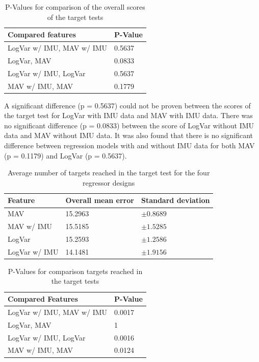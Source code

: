 \documentclass[a4paper, 10pt, conference]{ieeeconf}      %
\begin{document}
\begin{multicol}{2}
	\begin{table}[H]
		\begin{center}
			\begin{tabular}{l l}
				\hline
				\textbf{Compared features} & \textbf{P-Value}\\
				\hline
				LogVar w/ IMU, MAV w/ IMU & 0.5637 \\
				LogVar, MAV & 0.0833 \\
				LogVar w/ IMU, LogVar & 0.5637 \\
				MAV w/ IMU, MAV & 0.1779 \\
				\hline
			\end{tabular}
			\caption{P-Values for comparison of the overall scores of the target tests}
		\end{center}
	\end{table}
	
	A significant difference (p = 0.5637) could not be proven between the scores of the target test for LogVar with IMU data and MAV with IMU data. There was no significant difference (p = 0.0833) between the score of LogVar without IMU data and MAV without IMU data. It was also found that there is no significant difference between regression models with and without IMU data for both MAV (p = 0.1179) and LogVar (p = 0.5637).	
	
	\begin{table}[H]
		\begin{center}
			\begin{tabular}{l l l}
				\hline
				\textbf{Feature} & \textbf{Overall mean error} & \textbf{Standard deviation}\\
				\hline
				MAV & 15.2963 & $\pm 0.8689$ \\
				MAV w/ IMU & 15.5185 & $\pm 1.5285$ \\
				LogVar & 15.2593 & $\pm 1.2586$ \\
				LogVar w/ IMU & 14.1481 & $\pm 1.9156$ \\
				\hline
			\end{tabular}
			\caption{Average number of targets reached in the target test for the four regressor designs}
		\end{center}
	\end{table}
	
	\begin{table}[H]
		\begin{center}
			\begin{tabular}{l l}
				\hline
				\textbf{Compared Features} & \textbf{P-Value}\\
				\hline
				LogVar w/ IMU, MAV w/ IMU & 0.0017 \\
				LogVar, MAV & 1 \\
				LogVar w/ IMU, LogVar & 0.0016 \\
				MAV w/ IMU, MAV & 0.0124 \\
				\hline
			\end{tabular}
			\caption{P-Values for comparison targets reached in the target tests}
		\end{center}
	\end{table}
	

\end{multicol}
\end{document}
